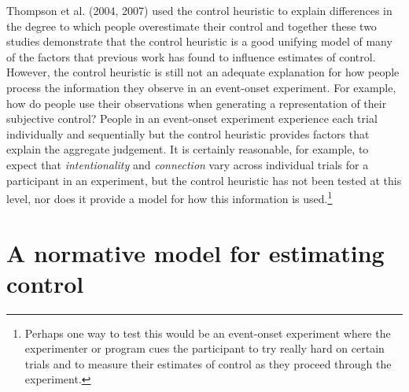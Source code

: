 \documentclass[USenglish,letterpaper,12pt,extrafontsizes,oneside,onecolumn,final]{memoir}
\begin{document}
Thompson et al. (2004, 2007) used the control heuristic to explain differences in the degree to which people overestimate their control and together these two studies demonstrate that the control heuristic is a good unifying model of many of the factors that previous work has found to influence estimates of control.  However, the control heuristic is still not an adequate explanation for how people process the information they observe in an event-onset experiment.  For example, how do people use their observations when generating a representation of their subjective control?  People in an event-onset experiment experience each trial individually and sequentially but the control heuristic provides factors that explain the aggregate judgement.  It is certainly reasonable, for example, to expect that \emph{intentionality} and \emph{connection} vary across individual trials for a participant in an experiment, but the control heuristic has not been tested at this level, nor does it provide a model for how this information is used.\footnote{Perhaps one way to test this would be an event-onset experiment where the experimenter or program cues the participant to try really hard on certain trials and to measure their estimates of control as they proceed through the experiment.}

\section{A normative model for estimating control}
\end{document}
